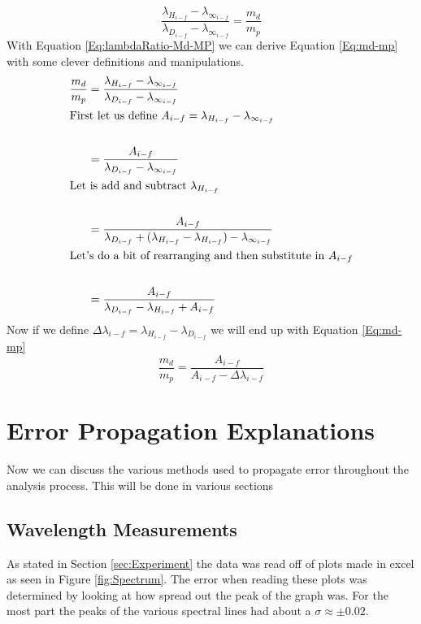 \documentclass[%
 aps,%
 pra,%
 preprint, %
 amsmath, %
 amsfonts, %
 amssymb, %
]{revtex4-2}
\begin{document}
\begin{equation}
    \label{Eq:lambdaRatio-Md-MP}
    \frac{\lambda_{H_{i-f}}-\lambda_{\infty_{i-f}}}{\lambda_{D_{i-f}}-\lambda_{\infty_{i-f}}}=\frac{m_d}{m_p}
\end{equation}{}
With Equation \ref{Eq:lambdaRatio-Md-MP} we can derive Equation \ref{Eq:md-mp} with some clever definitions and manipulations.
\begin{align*}
    \frac{m_d}{m_p}&=\frac{\lambda_{H_{i-f}}-\lambda_{\infty_{i-f}}}{\lambda_{D_{i-f}}-\lambda_{\infty_{i-f}}}\\
    \intertext{First let us define $A_{i-f}=\lambda_{H_{i-f}}-\lambda_{\infty_{i-f}}$}\\
    &=\frac{A_{i-f}}{\lambda_{D_{i-f}}-\lambda_{\infty_{i-f}}}\\
    \intertext{Let is add and subtract $\lambda_{H_{i-f}}$}\\
    &=\frac{A_{i-f}}{\lambda_{D_{i-f}}+(\lambda_{H_{i-f}}-\lambda_{H_{i-f}})-\lambda_{\infty_{i-f}}}\\
    \intertext{Let's do a bit of rearranging and then substitute in $A_{i-f}$}\\
    &=\frac{A_{i-f}}{\lambda_{D_{i-f}}-\lambda_{H_{i-f}}+A_{i-f}}\\
\end{align*}{}
Now if we define $\Delta \lambda_{i-f}=\lambda_{H_{i-f}}-\lambda_{D_{i-f}}$ we will end up with Equation \ref{Eq:md-mp}
\begin{equation}
 \frac{m_d}{m_p}=\frac{A_{i-f}}{A_{i-f}-\Delta \lambda_{i-f}}
\end{equation}


















\section{\label{app:Error} Error Propagation Explanations}
Now we can discuss the various methods used to propagate error throughout the analysis process. This will be done in various sections
\subsection{Wavelength Measurements}
As stated in Section \ref{sec:Experiment} the data was read off of plots made in excel as seen in Figure \ref{fig:Spectrum}. The error when reading these plots was determined by looking at how spread out the peak of the graph was. For the most part the peaks of the various spectral lines had about a $\sigma \approx \pm 0.02$. 
\end{document}
